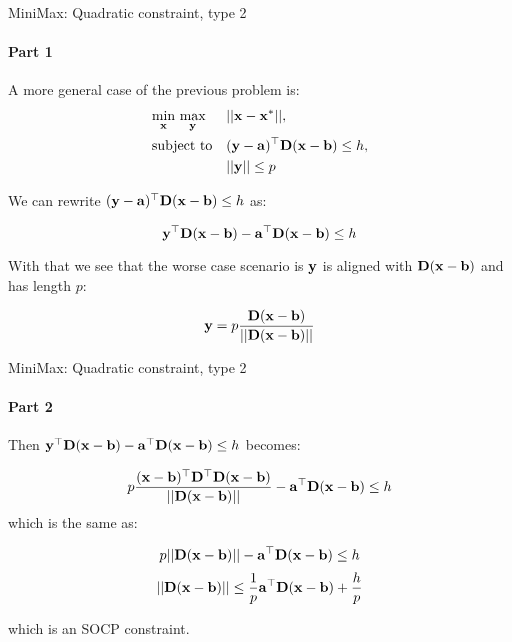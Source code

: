 \documentclass{beamer}
\begin{document}
\begin{frame}{MiniMax: Quadratic constraint, type 2}
\framesubtitle{Part 1}
\begin{flushleft}

A more general case of the previous problem is:
%
\begin{equation}
\begin{aligned}
& \underset{\mathbf{x}}{\text{min}} \ \underset{\mathbf{y}}{\text{max}}
& & ||\mathbf{x} - \mathbf{x}^*||, \\
& \text{subject to}
& & (\mathbf{y} - \mathbf{a})^\top \mathbf{D} (\mathbf{x} - \mathbf{b}) \leq h, \\
& & & ||\mathbf{y}|| \leq p
\end{aligned}
\end{equation}
%

We can rewrite $(\mathbf{y} - \mathbf{a})^\top \mathbf{D} (\mathbf{x} - \mathbf{b}) \leq h$ as:

\begin{equation}
    \mathbf{y}^\top \mathbf{D} (\mathbf{x} - \mathbf{b}) - \mathbf{a}^\top \mathbf{D} (\mathbf{x} - \mathbf{b}) \leq h
\end{equation}

With that we see that the worse case scenario is $\mathbf{y}$ is aligned with $\mathbf{D} (\mathbf{x} - \mathbf{b})$ and has length $p$:

\begin{equation}
    \mathbf{y} = p \frac{\mathbf{D} (\mathbf{x} - \mathbf{b})}{|| \mathbf{D} (\mathbf{x} - \mathbf{b}) ||}
\end{equation}

 
\end{flushleft}
\end{frame}




\begin{frame}{MiniMax: Quadratic constraint, type 2}
\framesubtitle{Part 2}
\begin{flushleft}

Then $\mathbf{y}^\top \mathbf{D} (\mathbf{x} - \mathbf{b}) - \mathbf{a}^\top \mathbf{D} (\mathbf{x} - \mathbf{b}) \leq h$ becomes:

\begin{equation}
    p \frac{ (\mathbf{x} - \mathbf{b})^\top \mathbf{D}^\top \mathbf{D} (\mathbf{x} - \mathbf{b}) }{|| \mathbf{D} (\mathbf{x} - \mathbf{b}) ||}  - \mathbf{a}^\top \mathbf{D} (\mathbf{x} - \mathbf{b}) \leq h
\end{equation}
%
which is the same as:

\begin{equation}
    p || \mathbf{D} (\mathbf{x} - \mathbf{b}) || - \mathbf{a}^\top \mathbf{D} (\mathbf{x} - \mathbf{b}) \leq h
\end{equation}
\begin{equation}
    || \mathbf{D} (\mathbf{x} - \mathbf{b}) ||  \leq \frac{1}{p}\mathbf{a}^\top \mathbf{D} (\mathbf{x} - \mathbf{b}) + \frac{h}{p}
\end{equation}

which is an SOCP constraint.
 
\end{flushleft}
\end{frame}
\end{document}
